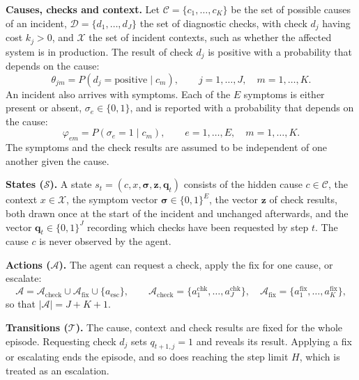 \textbf{Causes, checks and context.} Let $\mathcal{C} = \{c_1, \dots, c_K\}$ be the set of possible causes of an incident, $\mathcal{D} = \{d_1, \dots, d_J\}$ the set of diagnostic checks, with check $d_j$ having cost $k_j > 0$, and $\mathcal{X}$ the set of incident contexts, such as whether the affected system is in production. The result of check $d_j$ is positive with a probability that depends on the cause:
\begin{equation}
\theta_{jm} = P(d_j = \text{positive} \mid c_m), \qquad j = 1, \dots, J, \quad m = 1, \dots, K.
\label{eq:likelihood}
\end{equation}
An incident also arrives with symptoms. Each of the $E$ symptoms is either present or absent, $\sigma_e \in \{0, 1\}$, and is reported with a probability that depends on the cause:
\begin{equation}
\varphi_{em} = P(\sigma_e = 1 \mid c_m), \qquad e = 1, \dots, E, \quad m = 1, \dots, K.
\label{eq:symptoms}
\end{equation}
The symptoms and the check results are assumed to be independent of one another given the cause.

\textbf{States ($\mathcal{S}$).} A state $s_t = (c, x, \boldsymbol{\sigma}, \mathbf{z}, \mathbf{q}_t)$ consists of the hidden cause $c \in \mathcal{C}$, the context $x \in \mathcal{X}$, the symptom vector $\boldsymbol{\sigma} \in \{0,1\}^E$, the vector $\mathbf{z}$ of check results, both drawn once at the start of the incident and unchanged afterwards, and the vector $\mathbf{q}_t \in \{0,1\}^J$ recording which checks have been requested by step $t$. The cause $c$ is never observed by the agent.

\textbf{Actions ($\mathcal{A}$).} The agent can request a check, apply the fix for one cause, or escalate:
\begin{equation}
\mathcal{A} = \mathcal{A}_{\text{check}} \cup \mathcal{A}_{\text{fix}} \cup \{a_{\text{esc}}\}, \qquad
\mathcal{A}_{\text{check}} = \{a^{\text{chk}}_1, \dots, a^{\text{chk}}_J\}, \quad
\mathcal{A}_{\text{fix}} = \{a^{\text{fix}}_1, \dots, a^{\text{fix}}_K\},
\end{equation}
so that $|\mathcal{A}| = J + K + 1$.

\textbf{Transitions ($\mathcal{T}$).} The cause, context and check results are fixed for the whole episode. Requesting check $d_j$ sets $q_{t+1,j} = 1$ and reveals its result. Applying a fix or escalating ends the episode, and so does reaching the step limit $H$, which is treated as an escalation.

